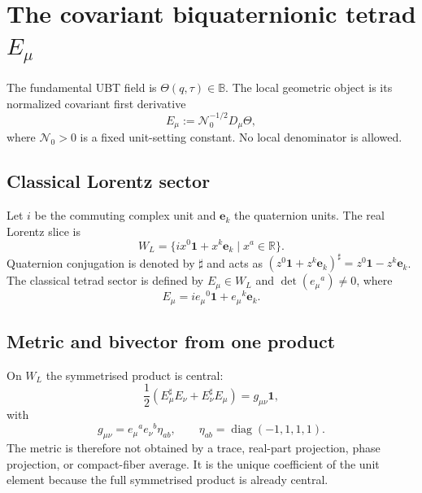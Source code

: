 
\section{The covariant biquaternionic tetrad $E_\mu$}
\label{sec:canonical:biquaternion_tetrad}

The fundamental UBT field is $\Theta(q,\tau)\in\mathbb B$.  The local geometric
object is its normalized covariant first derivative
\begin{equation}
 \boxed{E_\mu:=\mathcal N_0^{-1/2}D_\mu\Theta,}
 \label{eq:canonical:E-from-Theta}
\end{equation}
where $\mathcal N_0>0$ is a fixed unit-setting constant.  No local denominator
is allowed.

\subsection{Classical Lorentz sector}
Let $i$ be the commuting complex unit and $\mathbf e_k$ the quaternion units.
The real Lorentz slice is
\begin{equation}
 W_L=\{i x^0\mathbf1+x^k\mathbf e_k\mid x^a\in\mathbb R\}.
\end{equation}
Quaternion conjugation is denoted by $\sharp$ and acts as
$(z^0\mathbf1+z^k\mathbf e_k)^\sharp=z^0\mathbf1-z^k\mathbf e_k$.
The classical tetrad sector is defined by $E_\mu\in W_L$ and
$\det(e_\mu{}^a)\neq0$, where
\begin{equation}
 E_\mu=i e_\mu{}^0\mathbf1+e_\mu{}^k\mathbf e_k.
\end{equation}

\subsection{Metric and bivector from one product}
On $W_L$ the symmetrised product is central:
\begin{equation}
 \boxed{\frac12(E_\mu^\sharp E_\nu+E_\nu^\sharp E_\mu)
       =g_{\mu\nu}\mathbf1,}
 \label{eq:canonical:central-metric}
\end{equation}
with
\begin{equation}
 g_{\mu\nu}=e_\mu{}^a e_\nu{}^b\eta_{ab},
 \qquad \eta_{ab}=\operatorname{diag}(-1,1,1,1).
\end{equation}
The metric is therefore not obtained by a trace, real-part projection, phase
projection, or compact-fiber average.  It is the unique coefficient of the
unit element because the full symmetrised product is already central.

